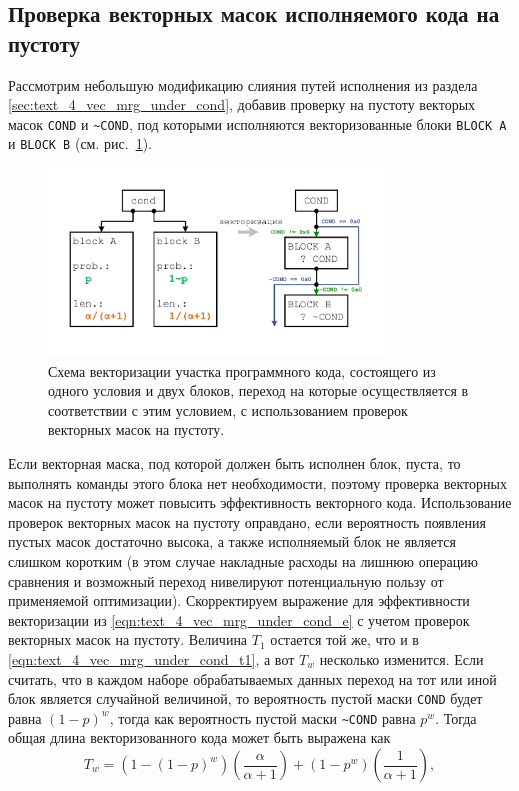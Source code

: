 \subsection{Проверка векторных масок исполняемого кода на пустоту}

Рассмотрим небольшую модификацию слияния путей исполнения из раздела \ref{sec:text_4_vec_mrg_under_cond}, добавив проверку на пустоту векторых масок \texttt{COND} и \texttt{\textasciitilde COND}, под которыми исполняются векторизованные блоки \texttt{BLOCK A} и \texttt{BLOCK B} (см. рис.~\ref{fig:text_4_vec_check_mask_cond}). 

\begin{figure}[ht]
	\centering
		\includegraphics[width=0.8\textwidth]{./pics/text_4_vec_check_mask/cond.pdf}
	\caption{Схема векторизации участка программного кода, состоящего из одного условия и двух блоков, переход на которые осуществляется в соответствии с этим условием, с использованием проверок векторных масок на пустоту.}
	\label{fig:text_4_vec_check_mask_cond}
\end{figure}

Если векторная маска, под которой должен быть исполнен блок, пуста, то выполнять команды этого блока нет необходимости, поэтому проверка векторных масок на пустоту может повысить эффективность векторного кода.
Использование проверок векторных масок на пустоту оправдано, если вероятность появления пустых масок достаточно высока, а также исполняемый блок не является слишком коротким (в этом случае накладные расходы на лишнюю операцию сравнения и возможный переход нивелируют потенциальную пользу от применяемой оптимизации).
Скорректируем выражение для эффективности векторизации из \eqref{eqn:text_4_vec_mrg_under_cond_e} с учетом проверок векторных масок на пустоту.
Величина $T_1$ остается той же, что и в \eqref{eqn:text_4_vec_mrg_under_cond_t1}, а вот $T_w$ несколько изменится.
Если считать, что в каждом наборе обрабатываемых данных переход на тот или иной блок является случайной величиной, то вероятность пустой маски \texttt{COND} будет равна $(1 - p)^w$, тогда как вероятность пустой маски \texttt{\textasciitilde COND} равна $p^w$.
Тогда общая длина векторизованного кода может быть выражена как
\begin{equation}\label{eqn:text_4_vec_check_mask_tw}
	T_w = \left(1 - (1 - p)^w\right)\left(\frac{\alpha}{\alpha + 1}\right) + (1 - p^w)\left(\frac{1}{\alpha + 1}\right),
\end{equation}

